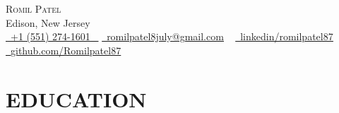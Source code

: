 \documentclass[letterpaper,11pt]{article}
\makeatletter
\newcommand{\resumeSubheading}[4]{
  \vspace{-2pt}\item
    \begin{tabular*}{1.0\textwidth}[t]{l@{\extracolsep{\fill}}r}
      \textbf{\large#1} & \textbf{\small #2} \\
      \textit{\large#3} & \textit{\small #4} \\   
    \end{tabular*}\vspace{-7pt}
}
\newcommand{\resumeSubHeadingListStart}{\begin{itemize}[leftmargin=0.0in, label={}]}
\newcommand{\resumeSubHeadingListEnd}{\end{itemize}}
\makeatother
\begin{document}
\begin{center}
    {\Huge \scshape Romil Patel} \\ \vspace{1pt}
    Edison, New Jersey \\ \vspace{1pt}
    \vspace{8pt}
    \small \href{tel:+1 (551) 274-1601}{ \raisebox{-0.1\height}\faPhone\ \underline{+1 (551) 274-1601} ~} 
    \href{mailto:romilpatel8july@gmail.com}{\raisebox{-0.2\height}\faEnvelope\  \underline{romilpatel8july@gmail.com}} ~ 
    \href{https://www.linkedin.com/in/romilpatel87/}{\raisebox{-0.2\height}\faLinkedinSquare\ \underline{linkedin/romilpatel87}}  ~
    \href{https://github.com/Romilpatel87?tab=repositories}{\raisebox{-0.2\height}\faGithub\ \underline{github.com/Romilpatel87}} ~
    \vspace{6pt}
\end{center}
\section{EDUCATION}
\end{document}
